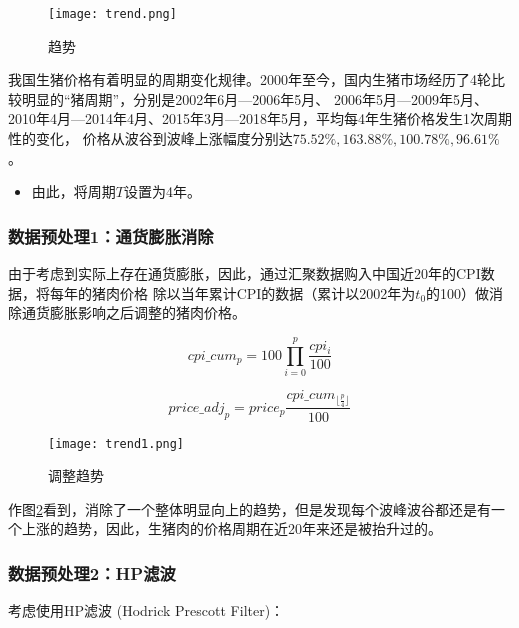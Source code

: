 \documentclass[a4paper,AutoFakeBold,AutoFakeSlant]{ctexart}
\begin{document}
\begin{figure}[H]
  \centering
  \texttt{[image: trend.png]}
  \caption{趋势}
  \label{f3}
\end{figure}


我国生猪价格有着明显的周期变化规律。2000年至今，国内生猪市场经历了4轮比较明显的“猪周期”，分别是2002年6月—2006年5月、
2006年5月—2009年5月、2010年4月—2014年4月、2015年3月—2018年5月，平均每4年生猪价格发生1次周期性的变化，
价格从波谷到波峰上涨幅度分别达$75.52\%, 163.88\%, 100.78\%, 96.61\%$ \cite{2021年我国生猪价格走势及未来市场变化分析}。

\begin{itemize}
  \item 由此，将周期$ T $设置为4年。
\end{itemize}

\subsubsection{数据预处理1：通货膨胀消除}
由于考虑到实际上存在通货膨胀，因此，通过汇聚数据购入中国近20年的CPI数据\cite{CPI}，将每年的猪肉价格
除以当年累计CPI的数据（累计以2002年为$t_0$的100）做消除通货膨胀影响之后调整的猪肉价格。

\begin{equation}
  cpi\_ cum_p = 100 \prod \limits_{i=0}^{p} \frac{cpi_i}{100}
\end{equation}

\begin{equation}
  price\_ adj_p = price_p \frac{cpi\_ cum_{\lfloor \frac{p}{4} \rfloor}}{100}
\end{equation}

\begin{figure}[H]
  \centering
  \texttt{[image: trend1.png]}
  \caption{调整趋势}
  \label{f4}
\end{figure}

作图\ref{f4}看到，消除了一个整体明显向上的趋势，但是发现每个波峰波谷都还是有一个上涨的趋势，因此，生猪肉的价格周期在近20年来还是被抬升过的。


\subsubsection{数据预处理2：HP滤波}
考虑使用HP滤波 (Hodrick Prescott Filter)：
\end{document}
